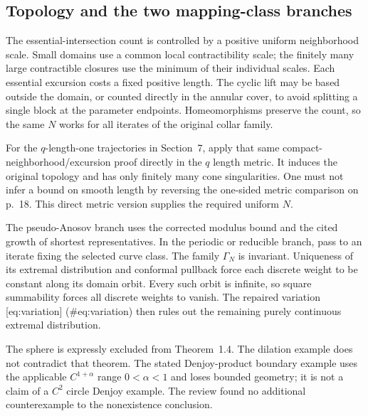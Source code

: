 \documentclass[10pt]{article}
\begin{document}
\subsection*{Topology and the two mapping-class branches}
The essential-intersection count is controlled by a positive uniform neighborhood scale. Small domains use a common local contractibility scale; the finitely many large contractible closures use the minimum of their individual scales. Each essential excursion costs a fixed positive length. The cyclic lift may be based outside the domain, or counted directly in the annular cover, to avoid splitting a single block at the parameter endpoints. Homeomorphisms preserve the count, so the same \(N\) works for all iterates of the original collar family.\par
For the \(q\)-length-one trajectories in Section 7, apply that same compact-neighborhood/excursion proof directly in the \(q\) length metric. It induces the original topology and has only finitely many cone singularities. One must not infer a bound on smooth length by reversing the one-sided metric comparison on p. 18. This direct metric version supplies the required uniform \(N\).\par
The pseudo-Anosov branch uses the corrected modulus bound and the cited growth of shortest representatives. In the periodic or reducible branch, pass to an iterate fixing the selected curve class. The family \(\Gamma_N\) is invariant. Uniqueness of its extremal distribution and conformal pullback force each discrete weight to be constant along its domain orbit. Every such orbit is infinite, so square summability forces all discrete weights to vanish. The repaired variation [eq:variation] (\#eq:variation) then rules out the remaining purely continuous extremal distribution.\par
The sphere is expressly excluded from Theorem 1.4. The dilation example does not contradict that theorem. The stated Denjoy-product boundary example uses the applicable \(C^{1+\alpha}\) range \(0<\alpha<1\) and loses bounded geometry; it is not a claim of a \(C^2\) circle Denjoy example. The review found no additional counterexample to the nonexistence conclusion.\par
\end{document}
